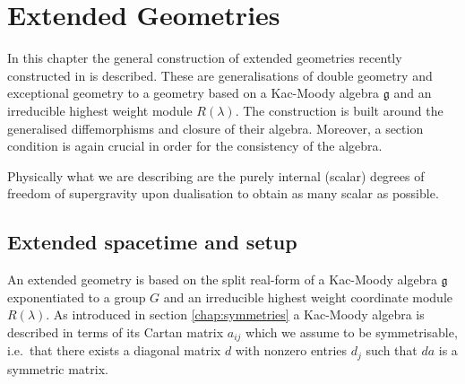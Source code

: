 \chapter{Extended Geometries}\label{chap:ExtendedGeometries}
In this chapter the general construction of extended geometries recently constructed in \cite{CederwallPalmkvist2017} is described. These are generalisations of double geometry and exceptional geometry to a geometry based on a Kac-Moody algebra $\mathfrak{g}$ and an irreducible highest weight module $R(\lambda)$. The construction is built around the generalised diffemorphisms and closure of their algebra. Moreover, a section condition is again crucial in order for the consistency of the algebra. 

Physically what we are describing are the purely internal (scalar) degrees of freedom of supergravity upon dualisation to obtain as many scalar as possible.  

\section{Extended spacetime and setup}
An extended geometry is based on the split real-form of a Kac-Moody algebra $\mathfrak{g}$ exponentiated to a group $G$ and an irreducible highest weight coordinate module $R(\lambda)$. As introduced in section \ref{chap:symmetries} a Kac-Moody algebra is described in terms of its Cartan matrix $a_{ij}$ which we assume to be symmetrisable, i.e.\ that there exists a diagonal matrix $d$ with nonzero entries $d_j$ such that $da$ is a symmetric matrix. 

